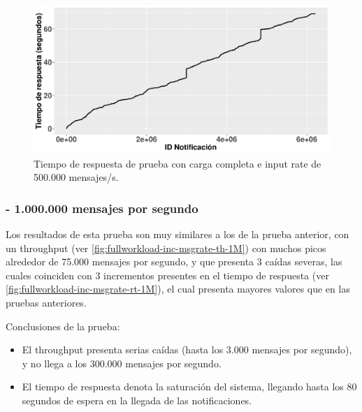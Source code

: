 \begin{figure}[htpb]
    \centering
    \includegraphics[width=\textwidth]{images/full-worklad-inc-msgrate/rt_full-workload-inc-msgrate_500k.pdf}
    \caption{Tiempo de respuesta de prueba con carga completa e input rate de 500.000 mensajes/s.}
    \label{fig:fullworkload-inc-msgrate-rt-500k}
\end{figure}


\subsubsection*{- 1.000.000 mensajes por segundo}

Los resultados de esta prueba son muy similares a los de la prueba anterior,
con un throughput (ver \autoref{fig:fullworkload-inc-msgrate-th-1M}) con muchos
picos alrededor de 75.000 mensajes por segundo, y que presenta 3 caídas severas,
las cuales coinciden con 3 incrementos presentes en el tiempo de respuesta (ver
\autoref{fig:fullworkload-inc-msgrate-rt-1M}), el cual presenta mayores valores
que en las pruebas anteriores.

Conclusiones de la prueba:
\begin{itemize}
    \item El throughput presenta serias caídas (hasta los 3.000 mensajes por segundo),
    y no llega a los 300.000 mensajes por segundo.
    \item El tiempo de respuesta denota la saturación del sistema, llegando hasta
    los 80 segundos de espera en la llegada de las notificaciones.
\end{itemize}

